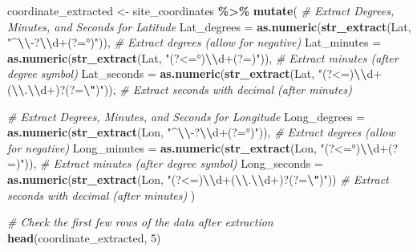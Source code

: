 \documentclass[
]{article}
\newenvironment{Shaded}{\begin{snugshade}}{\end{snugshade}}
\newcommand{\AttributeTok}[1]{\textcolor[rgb]{0.13,0.29,0.53}{#1}}
\newcommand{\CommentTok}[1]{\textcolor[rgb]{0.56,0.35,0.01}{\textit{#1}}}
\newcommand{\DecValTok}[1]{\textcolor[rgb]{0.00,0.00,0.81}{#1}}
\newcommand{\FunctionTok}[1]{\textcolor[rgb]{0.13,0.29,0.53}{\textbf{#1}}}
\newcommand{\NormalTok}[1]{#1}
\newcommand{\OtherTok}[1]{\textcolor[rgb]{0.56,0.35,0.01}{#1}}
\newcommand{\SpecialCharTok}[1]{\textcolor[rgb]{0.81,0.36,0.00}{\textbf{#1}}}
\newcommand{\StringTok}[1]{\textcolor[rgb]{0.31,0.60,0.02}{#1}}
\begin{document}
\begin{Shaded}
\begin{Highlighting}[]
\NormalTok{coordinate\_extracted }\OtherTok{\textless{}{-}}\NormalTok{ site\_coordinates }\SpecialCharTok{\%\textgreater{}\%}
  \FunctionTok{mutate}\NormalTok{(}
    \CommentTok{\# Extract Degrees, Minutes, and Seconds for Latitude}
    \AttributeTok{Lat\_degrees =} \FunctionTok{as.numeric}\NormalTok{(}\FunctionTok{str\_extract}\NormalTok{(Lat, }\StringTok{"\^{}}\SpecialCharTok{\textbackslash{}\textbackslash{}}\StringTok{{-}?}\SpecialCharTok{\textbackslash{}\textbackslash{}}\StringTok{d+(?=°)"}\NormalTok{)),  }\CommentTok{\# Extract degrees (allow for negative)}
    \AttributeTok{Lat\_minutes =} \FunctionTok{as.numeric}\NormalTok{(}\FunctionTok{str\_extract}\NormalTok{(Lat, }\StringTok{"(?\textless{}=°)}\SpecialCharTok{\textbackslash{}\textbackslash{}}\StringTok{d+(?=\textquotesingle{})"}\NormalTok{)),  }\CommentTok{\# Extract minutes (after degree symbol)}
   \AttributeTok{Lat\_seconds =} \FunctionTok{as.numeric}\NormalTok{(}\FunctionTok{str\_extract}\NormalTok{(Lat, }\StringTok{"(?\textless{}=\textquotesingle{})}\SpecialCharTok{\textbackslash{}\textbackslash{}}\StringTok{d+(}\SpecialCharTok{\textbackslash{}\textbackslash{}}\StringTok{.}\SpecialCharTok{\textbackslash{}\textbackslash{}}\StringTok{d+)?(?=}\SpecialCharTok{\textbackslash{}"}\StringTok{)"}\NormalTok{)),  }\CommentTok{\# Extract seconds with decimal (after minutes)}

    \CommentTok{\# Extract Degrees, Minutes, and Seconds for Longitude}
    \AttributeTok{Long\_degrees =} \FunctionTok{as.numeric}\NormalTok{(}\FunctionTok{str\_extract}\NormalTok{(Lon, }\StringTok{"\^{}}\SpecialCharTok{\textbackslash{}\textbackslash{}}\StringTok{{-}?}\SpecialCharTok{\textbackslash{}\textbackslash{}}\StringTok{d+(?=°)"}\NormalTok{)),  }\CommentTok{\# Extract degrees (allow for negative)}
    \AttributeTok{Long\_minutes =} \FunctionTok{as.numeric}\NormalTok{(}\FunctionTok{str\_extract}\NormalTok{(Lon, }\StringTok{"(?\textless{}=°)}\SpecialCharTok{\textbackslash{}\textbackslash{}}\StringTok{d+(?=\textquotesingle{})"}\NormalTok{)),  }\CommentTok{\# Extract minutes (after degree symbol)}
       \AttributeTok{Long\_seconds =} \FunctionTok{as.numeric}\NormalTok{(}\FunctionTok{str\_extract}\NormalTok{(Lon, }\StringTok{"(?\textless{}=\textquotesingle{})}\SpecialCharTok{\textbackslash{}\textbackslash{}}\StringTok{d+(}\SpecialCharTok{\textbackslash{}\textbackslash{}}\StringTok{.}\SpecialCharTok{\textbackslash{}\textbackslash{}}\StringTok{d+)?(?=}\SpecialCharTok{\textbackslash{}"}\StringTok{)"}\NormalTok{))  }\CommentTok{\# Extract seconds with decimal (after minutes)}
\NormalTok{  )}

\CommentTok{\# Check the first few rows of the data after extraction}
\FunctionTok{head}\NormalTok{(coordinate\_extracted, }\DecValTok{5}\NormalTok{)}
\end{Highlighting}
\end{Shaded}
\end{document}
